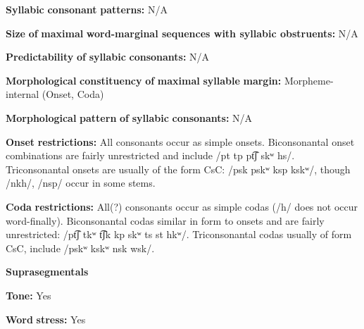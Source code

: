 \documentclass[output=paper]{langsci/langscibook}
\begin{document}
\begin{styleBody}
\textbf{Syllabic} \textbf{consonant} \textbf{patterns:} N/A
\end{styleBody}

\begin{styleBody}
\textbf{Size} \textbf{of} \textbf{maximal} \textbf{word{}-marginal sequences with syllabic obstruents:} N/A
\end{styleBody}

\begin{styleBody}
\textbf{Predictability} \textbf{of} \textbf{syllabic} \textbf{consonants:} N/A
\end{styleBody}

\begin{styleBody}
\textbf{Morphological} \textbf{constituency} \textbf{of} \textbf{maximal} \textbf{syllable} \textbf{margin:} Morpheme-internal (Onset, Coda)
\end{styleBody}

\begin{styleBody}
\textbf{Morphological} \textbf{pattern} \textbf{of} \textbf{syllabic} \textbf{consonants:} N/A
\end{styleBody}

\begin{styleBody}
\textbf{Onset} \textbf{restrictions:} All consonants occur as simple onsets. Biconsonantal onset combinations are fairly unrestricted and include /pt tp pt͡ʃ skʷ hs/. Triconsonantal onsets are usually of the form CsC: /psk pskʷ ksp kskʷ/, though /nkh/, /nsp/ occur in some stems.
\end{styleBody}

\begin{styleBody}
\textbf{Coda} \textbf{restrictions:} All(?) consonants occur as simple codas (/h/ does not occur word-finally). Biconsonantal codas similar in form to onsets and are fairly unrestricted: /pt͡ʃ tkʷ t͡ʃk kp skʷ ts st hkʷ/. Triconsonantal codas usually of form CsC, include /pskʷ kskʷ nsk wsk/.
\end{styleBody}

\begin{styleBody}
\textbf{Suprasegmentals}
\end{styleBody}

\begin{styleBody}
\textbf{Tone:} Yes
\end{styleBody}

\begin{styleBody}
\textbf{Word} \textbf{stress:} Yes
\end{styleBody}
\end{document}
